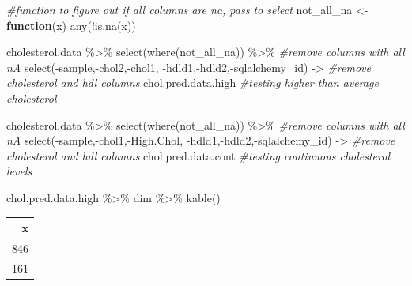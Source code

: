 \documentclass[
]{article}
\newenvironment{Shaded}{\begin{snugshade}}{\end{snugshade}}
\newcommand{\CommentTok}[1]{\textcolor[rgb]{0.56,0.35,0.01}{\textit{#1}}}
\newcommand{\ControlFlowTok}[1]{\textcolor[rgb]{0.13,0.29,0.53}{\textbf{#1}}}
\newcommand{\FunctionTok}[1]{\textcolor[rgb]{0.00,0.00,0.00}{#1}}
\newcommand{\NormalTok}[1]{#1}
\newcommand{\OtherTok}[1]{\textcolor[rgb]{0.56,0.35,0.01}{#1}}
\newcommand{\SpecialCharTok}[1]{\textcolor[rgb]{0.00,0.00,0.00}{#1}}
\begin{document}
\begin{Shaded}
\begin{Highlighting}[]
\CommentTok{\#function to figure out if all columns are na, pass to select  }
\NormalTok{not\_all\_na }\OtherTok{\textless{}{-}} \ControlFlowTok{function}\NormalTok{(x) }\FunctionTok{any}\NormalTok{(}\SpecialCharTok{!}\FunctionTok{is.na}\NormalTok{(x))  }

\NormalTok{cholesterol.data }\SpecialCharTok{\%\textgreater{}\%}
  \FunctionTok{select}\NormalTok{(}\FunctionTok{where}\NormalTok{(not\_all\_na)) }\SpecialCharTok{\%\textgreater{}\%} \CommentTok{\#remove columns with all nA}
  \FunctionTok{select}\NormalTok{(}\SpecialCharTok{{-}}\NormalTok{sample,}\SpecialCharTok{{-}}\NormalTok{chol2,}\SpecialCharTok{{-}}\NormalTok{chol1, }\SpecialCharTok{{-}}\NormalTok{hdld1,}\SpecialCharTok{{-}}\NormalTok{hdld2,}\SpecialCharTok{{-}}\NormalTok{sqlalchemy\_id) }\OtherTok{{-}\textgreater{}} \CommentTok{\#remove cholesterol and hdl columns}
\NormalTok{  chol.pred.data.high }\CommentTok{\#testing higher than average cholesterol}

\NormalTok{cholesterol.data }\SpecialCharTok{\%\textgreater{}\%}
  \FunctionTok{select}\NormalTok{(}\FunctionTok{where}\NormalTok{(not\_all\_na)) }\SpecialCharTok{\%\textgreater{}\%} \CommentTok{\#remove columns with all nA}
  \FunctionTok{select}\NormalTok{(}\SpecialCharTok{{-}}\NormalTok{sample,}\SpecialCharTok{{-}}\NormalTok{chol1,}\SpecialCharTok{{-}}\NormalTok{High.Chol, }\SpecialCharTok{{-}}\NormalTok{hdld1,}\SpecialCharTok{{-}}\NormalTok{hdld2,}\SpecialCharTok{{-}}\NormalTok{sqlalchemy\_id) }\OtherTok{{-}\textgreater{}} \CommentTok{\#remove cholesterol and hdl columns}
\NormalTok{  chol.pred.data.cont }\CommentTok{\#testing continuous cholesterol levels}



  
\NormalTok{ chol.pred.data.high }\SpecialCharTok{\%\textgreater{}\%}
\NormalTok{   dim }\SpecialCharTok{\%\textgreater{}\%}
   \FunctionTok{kable}\NormalTok{()}
\end{Highlighting}
\end{Shaded}

\begin{longtable}[]{@{}r@{}}
\toprule()
x \\
\midrule()
\endhead
846 \\
161 \\
\bottomrule()
\end{longtable}
\end{document}
